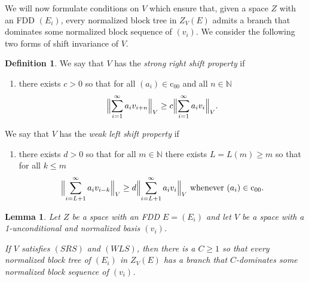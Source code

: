 \documentclass[11pt,leqno]{amsart}
\newtheorem{lem}[thm]{Lemma}
\theoremstyle{definition}
\newtheorem*{defin}{Definition}
\newcommand{\N}{\mathbb{N}}
\newcommand{\coo}{\mathrm{c}_{00}}
\begin{document}
We will now formulate  conditions on $V$ which ensure that,  given a
space $Z$ with an FDD $(E_i)$, every normalized block tree in
$Z_V(E)$ admits a branch that dominates some normalized block sequence
of $(v_i)$. We consider the following two  forms of shift invariance
of $V$.

\begin{defin}\label{D:2.2}
We say that $V$ has the {\em strong right  shift property} if
\begin{enumerate}
\item[(SRS)]  there exists $c>0$
 so that for all $(a_i)\in\coo$ and all $n\in\N$
$$\Bigl\|\sum_{i=1}^\infty a_i v_{i+n}\Bigr\|_V
\ge c\Bigl\|\sum_{i=1}^\infty a_i v_{i}\Bigr\|_V.$$
\end{enumerate}
We say that $V$ has the {\em weak left shift property} if
\begin{enumerate}
\item[(WLS)] there exists $d>0$ so that for all $m\in\N$ there exists
  $L=L(m)\ge m$ so that for all $k\le m$
$$\Bigl\|\sum_{i=L+1}^\infty a_i v_{i-k}\Bigr\|_V
\ge d\Bigl\|\sum_{i=L+1}^\infty a_i v_{i}\Bigr\|_V
 \text{ whenever }(a_i)\in\coo.$$
\end{enumerate}
\end{defin}
\begin{lem}\label{L:2.3}
 Let $Z$ be a space with an FDD $E=(E_i)$ and let $V$ be a space with
 a 1-unconditional and normalized basis $(v_i)$.

 If $V$ satisfies  $(SRS)$ and $(WLS)$, then there is a $C\ge 1$ so that
 every normalized block tree of $(E_i)$ in $Z_V(E)$  has a branch that
 $C$-dominates some normalized block sequence of $(v_i)$.
\end{lem}
\end{document}
